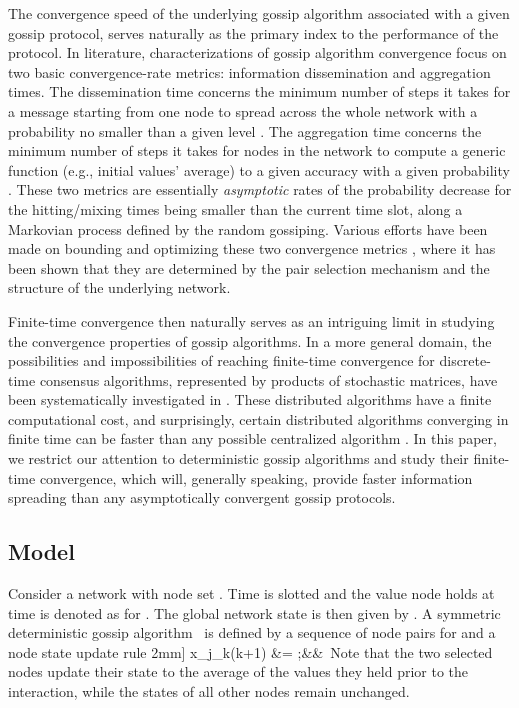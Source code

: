 \documentclass[a4paper, 11pt]{article}
\begin{document}
The convergence speed of the underlying gossip algorithm associated with a given gossip protocol, serves naturally as the primary index to the performance of the protocol. In literature, characterizations of gossip algorithm convergence focus on two basic convergence-rate metrics: information dissemination and aggregation times. The dissemination  time concerns the minimum number of steps it takes for a message starting from one node to spread across the whole network with a probability no smaller than a given level \cite{Karp 2000}. The  aggregation time concerns the minimum number of steps it takes  for nodes in the network to compute a generic function (e.g., initial values' average) to a given accuracy with a given probability \cite{Kempe2003}. These two metrics are essentially  {\em asymptotic} rates of the probability decrease for the hitting/mixing times being  smaller than the current time slot, along a Markovian process defined by the random gossiping. Various efforts have been made on bounding and optimizing these two convergence metrics \cite{Frieze 1985,Pittel1987,Karp2000, Kempe2003,Boyd2006,Boyd2004,Benezit2010,Murray2012, Doerr2012, Iutzeler2013,Liu2011}, where it has been shown that they are  determined by the pair selection mechanism and the structure of the underlying network.

{
Finite-time convergence then naturally serves as an intriguing  limit in studying the convergence properties of gossip algorithms.
In a more general domain, the possibilities and impossibilities of reaching finite-time convergence for discrete-time consensus algorithms, represented by products of stochastic matrices,  have been  systematically investigated in \cite{Finite1,Finite2,julien-automatica,julien-tac}.  These distributed algorithms have a finite computational cost, and surprisingly,  certain distributed algorithms converging in
finite time  can be  faster than any possible centralized
algorithm \cite{julien-automatica}. In this paper, we restrict our attention to deterministic gossip algorithms and study their finite-time convergence, which will,  generally speaking, provide faster information spreading than any asymptotically convergent gossip protocols.
}



\subsection{Model}  Consider a network with node set . Time is slotted and the value  node  holds at time  is denoted as  for . The global network state is then given by .  A symmetric deterministic gossip  algorithm~\cite{Kempe2003,Boyd2006} is defined by a sequence of node pairs  for  and a node state update rule
2mm]
	x_{j_k}(k+1) &= ;&&\
Note that the two selected nodes update their state to the average of the values they held prior to the interaction, while the states of all other nodes remain unchanged.
\end{document}
